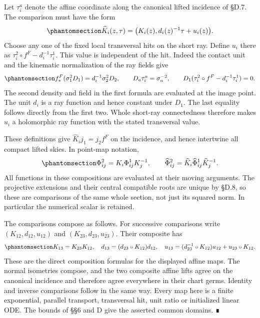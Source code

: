 \documentclass[
  english,
  11pt,
  reqno]{amsart}
\begin{document}
Let \(\tau_i^a\) denote the affine coordinate along the canonical lifted
incidence of §D.7. The comparison must have the form
\begin{equation}\protect\phantomsection\label{eq:gg-actual-source-affine-comparison}{
 \widehat K_i(z,\tau)
   =\bigl(K_i(z),d_i(z)^{-1}\tau+u_i(z)\bigr).
}\end{equation} Choose any one of the fixed local transversal hits on
the short ray. Define \(u_i\) there as
\(\tau_i^2\circ f^F-d_i^{-1}\tau_i^1\). This value is independent of the
hit. Indeed the contact unit and the kinematic normalization of the ray
fields give
\begin{equation}\protect\phantomsection\label{eq:gg-source-affine-slice-independence}{
 f^F_*(\sigma_1^2D_1)
       =d_i^{-1}\sigma_2^2D_2,\qquad
 D_a\tau_i^a=\sigma_a^{-2},\qquad
 D_1(\tau_i^2\circ f^F-d_i^{-1}\tau_i^1)=0 .
}\end{equation} The second density and field in the first formula are
evaluated at the image point. The unit \(d_i\) is a ray function and
hence constant under \(D_1\). The last equality follows directly from
the first two. Whole short-ray connectedness therefore makes \(u_i\) a
holomorphic ray function with the stated transversal value.

These definitions give \(\widehat K_i j_1=j_2 f^F\) on the incidence,
and hence intertwine all compact lifted skies. In point-map notation,
\begin{equation}\protect\phantomsection\label{eq:gg-actual-source-overlap-conjugacy}{
 \Phi^2_{ij}=K_i\Phi^1_{ij}K_j^{-1},\qquad
 \widehat\Phi^2_{ij}
       =\widehat K_i\widehat\Phi^1_{ij}\widehat K_j^{-1}.
}\end{equation} All functions in these compositions are evaluated at
their moving arguments. The projective extensions and their central
compatible roots are unique by §D.8, so these are comparisons of the
same whole section, not just its squared norm. In particular the
numerical scalar is retained.

The comparisons compose as follows. For successive comparisons write
\((K_{12},d_{12},u_{12})\) and \((K_{23},d_{23},u_{23})\). Their
composite has
\begin{equation}\protect\phantomsection\label{eq:gg-source-comparison-coherence}{
 K_{13}=K_{23}K_{12},\quad
 d_{13}=(d_{23}\circ K_{12})d_{12},\quad
 u_{13}=(d_{23}^{-1}\circ K_{12})u_{12}+u_{23}\circ K_{12}.
}\end{equation} These are the direct composition formulas for the
displayed affine maps. The normal isometries compose, and the two
composite affine lifts agree on the canonical incidence and therefore
agree everywhere in their chart germs. Identity and inverse comparisons
follow in the same way. Every map here is a finite exponential, parallel
transport, transversal hit, unit ratio or initialized linear ODE. The
bounds of §§6 and D give the asserted common domains. ∎
\end{document}
